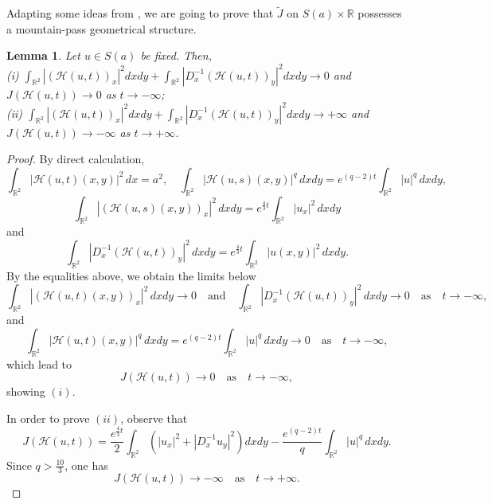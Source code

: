 \documentclass[11pt]{amsart}
\newtheorem{lemma}[theorem]{Lemma}
\numberwithin{equation}{section}
\begin{document}
{{{$$$$
Adapting some ideas from \cite{Jean}, we are going to prove that $\tilde{J}$ on $S(a) \times \mathbb{R}$ possesses a  mountain-pass geometrical structure.
\begin{lemma}\label{M1}
    Let $u \in S(a)$ be fixed. Then, \\
    (i) $\displaystyle \int_{\mathbb{R}^2}\left| (\mathcal{H}(u, t))_x\right|^2 dxdy+\int_{\mathbb{R}^2}\left|D_x^{-1}(\mathcal{H}(u, t))_y\right|^2 dxdy \rightarrow 0$ and $J(\mathcal{H}(u, t)) \rightarrow 0$ as $t \rightarrow-\infty$;\\
    (ii) $\displaystyle \int_{\mathbb{R}^2}\left| (\mathcal{H}(u, t))_x\right|^2 dxdy+\int_{\mathbb{R}^2}\left|D_x^{-1}(\mathcal{H}(u, t))_y\right|^2 dxdy \rightarrow +\infty$ and $J(\mathcal{H}(u, t)) \rightarrow-\infty$ as $t \rightarrow+\infty$.
\end{lemma}


\begin{proof} \mbox{} By direct calculation,
    \begin{equation} \label{CONV0}\int_{\mathbb{R}^2}\vert \mathcal{H}(u, t)(x, y)\vert^{2}\,dx=a^{2}, \quad \int_{\mathbb{R}^2}|\mathcal{H}(u, s)(x, y)|^q\,dxdy=e^{(q-2)t}\int_{\mathbb{R}^2}|u|^q\,dxdy,
    \end{equation}
    \begin{equation}\label{INE1}
        \int_{\mathbb{R}^2}|\left(\mathcal{H}(u, s)(x, y)\right)_x|^2\,dxdy=e^{\frac{4}{3}t}\int_{\mathbb{R}^2}|u_x|^2\,dxdy
    \end{equation}
    and
    \begin{equation} \label{INE2}
        \int_{\mathbb{R}^2}|D_x^{-1}(\mathcal{H}(u, t))_y|^2\,dxdy=e^{\frac{4}{3}t}\int_{\mathbb{R}^2}|u(x,y)|^2\,dxdy.
    \end{equation}
    By the equalities above, we obtain the limits below
    \begin{equation} \label{CONV1}
        \int_{\mathbb{R}^2}|\left(\mathcal{H}(u, t)(x, y)\right)_x|^2\,dxdy\rightarrow 0 \quad \mbox{and} \quad\int_{\mathbb{R}^2}|D_x^{-1}(\mathcal{H}(u, t))_y|^2\,dxdy \to 0 \quad  \mbox{as} \quad t \to -\infty,
    \end{equation}
    and
    $$
    \int_{\mathbb{R}^2}|\mathcal{H}(u, t)(x, y)|^q\,dxdy=e^{(q-2)t}\int_{\mathbb{R}^2}|u|^q\,dxdy \to 0 \quad \mbox{as} \quad t \to -\infty,
    $$
    which lead to
    $$
    J(\mathcal{H}(u, t))\rightarrow 0 \quad \mbox{as} \quad  t\rightarrow -\infty,
    $$
    showing $(i)$.

    In order to prove $(ii)$, observe that
    $$
    J(\mathcal{H}(u, t))= \frac{e^{\frac{4}{3}t}}{2}\int_{\mathbb{R}^{2}}\left( |u_{x}|^{2}+|D^{-1}_{x} u_{y}|^{2}\right) dx dy-\frac{e^{(q-2)t}}{q}\int_{\mathbb{R}^2} |u|^q \,dxdy.
    $$
    Since $q>\frac{10}{3}$, one has
    $$
    J(\mathcal{H}(u, t))\rightarrow -\infty \quad \mbox{as} \quad t\rightarrow +\infty.
    $$
\end{proof}



}}}
\end{document}
